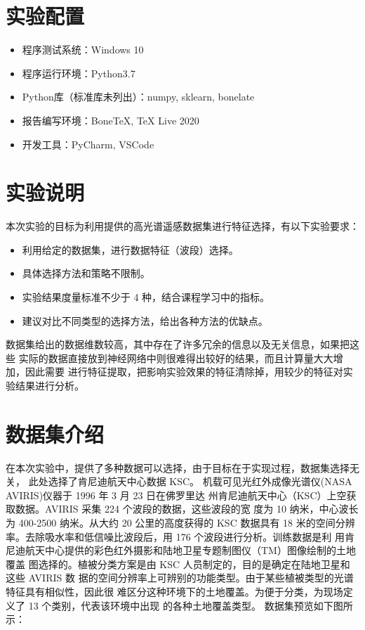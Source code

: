 \documentclass[cn,hazy,blue,14pt,normal]{elegantnote}
\begin{document}


\section{实验配置}
\begin{itemize}
    \item 程序测试系统：Windows 10
    \item 程序运行环境：Python3.7
    \item Python库（标准库未列出）：numpy, sklearn, bonelate
    \item 报告编写环境：Bone\TeX{}, \TeX{} Live 2020
    \item 开发工具：PyCharm, VSCode
\end{itemize}

\section{实验说明}
本次实验的目标为利用提供的高光谱遥感数据集进行特征选择，有以下实验要求：
\begin{itemize}
    \item 利用给定的数据集，进行数据特征（波段）选择。
    \item 具体选择方法和策略不限制。
    \item 实验结果度量标准不少于 4 种，结合课程学习中的指标。
    \item 建议对比不同类型的选择方法，给出各种方法的优缺点。
\end{itemize}
数据集给出的数据维数较高，其中存在了许多冗余的信息以及无关信息，如果把这些
实际的数据直接放到神经网络中则很难得出较好的结果，而且计算量大大增加，因此需要
进行特征提取，把影响实验效果的特征清除掉，用较少的特征对实验结果进行分析。

\section{数据集介绍}
在本次实验中，提供了多种数据可以选择，由于目标在于实现过程，数据集选择无关，
此处选择了肯尼迪航天中心数据 KSC。
机载可见光红外成像光谱仪(NASA AVIRIS)仪器于 1996 年 3 月 23 日在佛罗里达
州肯尼迪航天中心（KSC）上空获取数据。AVIRIS 采集 224 个波段的数据，这些波段的宽
度为 10 纳米，中心波长为 400-2500 纳米。从大约 20 公里的高度获得的 KSC 数据具有 18
米的空间分辨率。去除吸水率和低信噪比波段后，用 176 个波段进行分析。训练数据是利
用肯尼迪航天中心提供的彩色红外摄影和陆地卫星专题制图仪（TM）图像绘制的土地覆盖
图选择的。植被分类方案是由 KSC 人员制定的，目的是确定在陆地卫星和这些 AVIRIS 数
据的空间分辨率上可辨别的功能类型。由于某些植被类型的光谱特征具有相似性，因此很
难区分这种环境下的土地覆盖。为便于分类，为现场定义了 13 个类别，代表该环境中出现
的各种土地覆盖类型。
数据集预览如下图所示：
\end{document}

